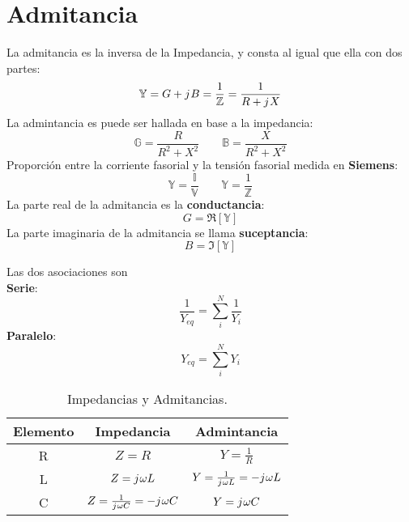 \documentclass[
	12pt, %
	fleqn, %
	a4paper, %
	oneside, %
]{LegrandOrangeBook}
\begin{document}
\section{Admitancia}\label{Admitancia}
La admitancia es la inversa de la Impedancia, y consta al igual que ella con dos partes:
\begin{equation*}
\mathbb{Y}=G+{j\mkern1mu} B=\frac{1}{\mathbb{Z}}=\frac{1}{R+{j\mkern1mu} X}
\end{equation*}
La admintancia es puede ser hallada en base a la impedancia:
\begin{equation*}
\mathbb{G}=\frac{R}{R^2+X^2}
\qquad
\mathbb{B}=\frac{X}{R^2+X^2}
\end{equation*}
Proporción entre la corriente fasorial y la tensión fasorial medida en \textbf{Siemens}:
\begin{equation*}
\mathbb{Y}=\frac{\mathbb{I}}{\mathbb{V}}
\qquad
\mathbb{Y}=\frac{1}{\mathbb{Z}}
\end{equation*}
La parte real de la admitancia es la \textbf{conductancia}:
\begin{displaymath}
G=\Re[\mathbb{Y}]
\end{displaymath}
La parte imaginaria de la admitancia se llama \textbf{suceptancia}:
\begin{displaymath}
B=\Im[\mathbb{Y}]
\end{displaymath}
\begin{definition}
Las dos asociaciones son\\
\textbf{Serie}:
\begin{equation}
\frac{1}{Y_{eq}}=\sum_i^N\frac{1}{Y_i}
\end{equation}
\textbf{Paralelo}:
\begin{equation}
Y_{eq}=\sum_i^NY_i
\end{equation}
\end{definition}
\begin{table}[]
\begin{center}
\begin{tabular}{|c|c|c|}
\hline
\rowcolor[HTML]{CBCEFB} 
Elemento & Impedancia                & Admintancia               \\ \hline
R        & $Z=R$                     & $Y=\frac{1}{R}$           \\ \hline
L        & $Z={j\mkern1mu}\omega L$           & $Y=\frac{1}{{j\mkern1mu}\omega L}=-{j\mkern1mu}\omega L$ \\ \hline
C        & $Z=\frac{1}{{j\mkern1mu}\omega C}=-{j\mkern1mu}\omega C$ & $Y={j\mkern1mu}\omega C$           \\ \hline
\end{tabular}
\end{center}
\caption{Impedancias y Admitancias.}
\end{table}
\end{document}
